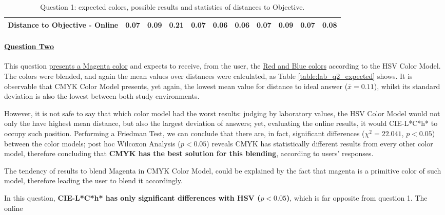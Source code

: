 \begin{table}[H]
{\begin{tabular}{lccccccccccccc}
    \multicolumn{4}{l}{Distance to Objective - Online}                                                                                               & \multicolumn{1}{|c}{0.07}       & \multicolumn{1}{c|}{0.09}    & \multicolumn{1}{|c}{0.21}       & \multicolumn{1}{c|}{0.07}    & \multicolumn{1}{|c}{\textbf{0.06}}       & \multicolumn{1}{c|}{0.06}    & \multicolumn{1}{|c}{0.07}       & \multicolumn{1}{c|}{0.09}    & \multicolumn{1}{|c}{0.07}       & \multicolumn{1}{c|}{0.08}    \\ \hline
    \end{tabular}}
  \caption[Question 1, with expected Results.]{Question 1: expected colors, possible results and statistics of distances to Objective.}
  \label{table:lab_q1_expected}
\end{table}
%
\paragraph{\ul{Question Two}}
%
This question \ul{presents a Magenta color} and expects to receive, from the user, the \ul{Red and Blue colors} according to the HSV Color Model.
The colors were blended, and again the mean values over distances were calculated, as Table \ref{table:lab_q2_expected} shows. It is observable
that CMYK Color Model presents, yet again, the lowest mean value for distance to ideal answer ($\overline{x} = 0.11$), whilst its standard
deviation is also the lowest between both study environments. \par
%
However, it is not safe to say that which color model had the worst results: judging by laboratory values, the HSV Color Model would not only
the have highest mean distance, but also the largest deviation of answers; yet, evaluating the online results, it would CIE-L*C*h* to occupy
such position. Performing a Friedman Test, we can conclude that there are, in fact, significant differences ($\chi^2 = 22.041$, $p < 0.05$) between
the color models; post hoc Wilcoxon Analysis ($p < 0.05$) reveals CMYK has statistically different results from every other color model, therefore
concluding that \textbf{CMYK has the best solution for this blending}, according to users' responses. \par
%
The tendency of results to blend Magenta in CMYK Color Model, could be explained by the fact that magenta is a primitive color of such model,
therefore leading the user to blend it accordingly. \par
%
In this question, \textbf{CIE-L*C*h* has only significant differences with HSV ($p < 0.05$)}, which is far opposite from question 1. The online
